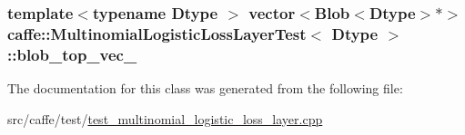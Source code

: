 \hypertarget{classcaffe_1_1_multinomial_logistic_loss_layer_test_a4783a4aa643582e0d8ee36eb9fc44889}{
\subsubsection[{blob\+\_\+top\+\_\+vec\+\_\+}]{\setlength{\rightskip}{0pt plus 5cm}template$<$typename Dtype $>$ vector$<${\bf Blob}$<$Dtype$>$$\ast$$>$ {\bf caffe\+::\+Multinomial\+Logistic\+Loss\+Layer\+Test}$<$ Dtype $>$\+::blob\+\_\+top\+\_\+vec\+\_\+\hspace{0.3cm}{\ttfamily [protected]}}}\label{classcaffe_1_1_multinomial_logistic_loss_layer_test_a4783a4aa643582e0d8ee36eb9fc44889}


The documentation for this class was generated from the following file\+:\begin{DoxyCompactItemize}
\item 
src/caffe/test/\hyperlink{test__multinomial__logistic__loss__layer_8cpp}{test\+\_\+multinomial\+\_\+logistic\+\_\+loss\+\_\+layer.\+cpp}\end{DoxyCompactItemize}
